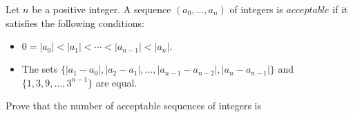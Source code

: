 Let $n$ be a positive integer.  A sequence $(a_0,\ldots,a_n)$ of integers is $\textit{acceptable}$ if it satisfies the following conditions:
\begin{itemize}
	\item $0=|a_0|<|a_1|<\cdots<|a_{n-1}|<|a_n|.$
	\item The sets $\{|a_1-a_0|,|a_2-a_1|,\ldots,|a_{n-1}-a_{n-2}|,|a_n-a_{n-1}|\}$ and $\{1,3,9,\ldots,3^{n-1}\}$ are equal.
\end{itemize}

Prove that the number of acceptable sequences of integers is 
